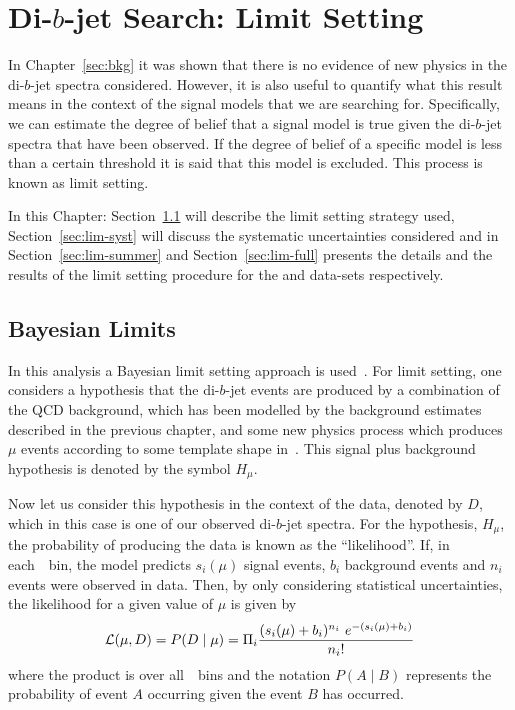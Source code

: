\chapter{Di-$b$-jet Search: Limit Setting}
\label{sec:lim}


In Chapter~\ref{sec:bkg} it was shown that there is no evidence of new physics in the di-$b$-jet spectra considered.
However, it is also useful to quantify what this result means in the context
of the signal models that we are searching for.
Specifically, we can estimate the degree of belief that a signal model is true given the di-$b$-jet spectra that have been observed.
If the degree of belief of a specific model is less than a certain threshold it is said that this model is excluded.
This process is known as limit setting.

In this Chapter:
Section~\ref{sec:lim-strat} will describe the limit setting strategy used,
Section~\ref{sec:lim-syst} will discuss the systematic uncertainties considered
and in Section~\ref{sec:lim-summer} and Section~\ref{sec:lim-full} presents the details and
the results of the limit setting procedure for the \summer{} and \lm{} data-sets respectively.

\section{Bayesian Limits}
\label{sec:lim-strat}

In this analysis a Bayesian limit setting approach is used~\cite{lim-bayes}.
For limit setting, one considers a hypothesis that the di-$b$-jet events are produced by a combination of 
the QCD background, which has been modelled by the background estimates described in the previous chapter,
and some new physics process 
which produces $\mu$ events according to some template shape in~\mjj.
This signal plus background hypothesis is denoted by the symbol $H_\mu$.

Now let us consider this hypothesis in the context of the data, denoted by $D$,
which in this case is one of our observed di-$b$-jet spectra.
For the hypothesis, $H_\mu$, the probability of producing the data is known as the ``likelihood''.
If, in each~\mjj~bin, the model predicts
$s_i(\mu)$ signal events, $b_i$ background events and $n_i$ events were observed in data.
Then, by only considering statistical uncertainties, the likelihood for a given value of $\mu$ is given by
\begin{equation}
  \mathcal{L} (\mu,D) = P(D \mid \mu) =  \Pi_i \frac{(s_i(\mu)+b_i)^{n_i}~e^{-(s_i(\mu)+b_i)}}{n_i!}
  \label{eqn:lim-like}
\end{equation}
where the product is over all~\mjj~bins and
the notation $P(A \mid B)$ represents the probability of event $A$ occurring
given the event $B$ has occurred.

